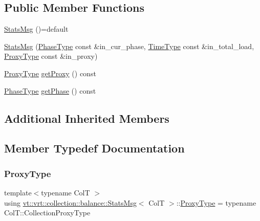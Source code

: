 \subsection*{Public Member Functions}
\begin{DoxyCompactItemize}
\item 
\hyperlink{structvt_1_1vrt_1_1collection_1_1balance_1_1_stats_msg_af801cc4ea278bc1d03ef87760cdb0ce4}{Stats\+Msg} ()=default
\item 
\hyperlink{structvt_1_1vrt_1_1collection_1_1balance_1_1_stats_msg_a0bab7add3b1971d1f2f0826128ab5a30}{Stats\+Msg} (\hyperlink{namespacevt_a46ce6733d5cdbd735d561b7b4029f6d7}{Phase\+Type} const \&in\+\_\+cur\+\_\+phase, \hyperlink{namespacevt_a876a9d0cd5a952859c72de8a46881442}{Time\+Type} const \&in\+\_\+total\+\_\+load, \hyperlink{structvt_1_1vrt_1_1collection_1_1balance_1_1_stats_msg_a6f88a58947e0a02b3f7dcfec8b91b5fd}{Proxy\+Type} const \&in\+\_\+proxy)
\item 
\hyperlink{structvt_1_1vrt_1_1collection_1_1balance_1_1_stats_msg_a6f88a58947e0a02b3f7dcfec8b91b5fd}{Proxy\+Type} \hyperlink{structvt_1_1vrt_1_1collection_1_1balance_1_1_stats_msg_ad6c41dfbee2143acc207716115023933}{get\+Proxy} () const
\item 
\hyperlink{namespacevt_a46ce6733d5cdbd735d561b7b4029f6d7}{Phase\+Type} \hyperlink{structvt_1_1vrt_1_1collection_1_1balance_1_1_stats_msg_a81328064a6ff12f8ae9629bdb400836e}{get\+Phase} () const
\end{DoxyCompactItemize}
\subsection*{Additional Inherited Members}


\subsection{Member Typedef Documentation}
\mbox{\label{structvt_1_1vrt_1_1collection_1_1balance_1_1_stats_msg_a6f88a58947e0a02b3f7dcfec8b91b5fd}} 
\subsubsection{\texorpdfstring{Proxy\+Type}{ProxyType}}
{\footnotesize\ttfamily template$<$typename ColT $>$ \\
using \hyperlink{structvt_1_1vrt_1_1collection_1_1balance_1_1_stats_msg}{vt\+::vrt\+::collection\+::balance\+::\+Stats\+Msg}$<$ ColT $>$\+::\hyperlink{structvt_1_1vrt_1_1collection_1_1balance_1_1_stats_msg_a6f88a58947e0a02b3f7dcfec8b91b5fd}{Proxy\+Type} =  typename Col\+T\+::\+Collection\+Proxy\+Type}



